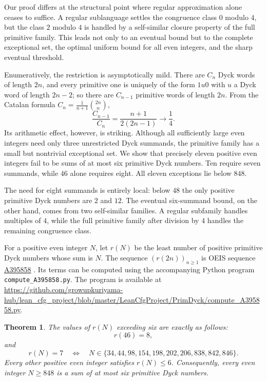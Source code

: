 \documentclass[12pt]{article}
\theoremstyle{plain}
\newtheorem{theorem}{Theorem}
\newcommand{\seqnum}[1]{\href{https://oeis.org/#1}{\rm \underline{#1}}}
\begin{document}
Our proof differs at the structural point where regular approximation
alone ceases to suffice.  A regular sublanguage settles the congruence
class $0$ modulo $4$, but the class $2$ modulo $4$ is handled by a
self-similar closure property of the full primitive family.  This leads
not only to an eventual bound but to the complete exceptional set, the
optimal uniform bound for all even integers, and the sharp eventual
threshold.

Enumeratively, the restriction is asymptotically mild.  There are $C_n$
Dyck words of length $2n$, and every primitive one is uniquely of the
form $1u0$ with $u$ a Dyck word of length $2n-2$; so there are
$C_{n-1}$ primitive words of length $2n$.  From the Catalan formula
$C_n=\frac1{n+1}\binom{2n}{n}$,
\[
 \frac{C_{n-1}}{C_n}=\frac{n+1}{2(2n-1)}\longrightarrow\frac14 .
\]
Its arithmetic effect, however, is striking.  Although all sufficiently
large even integers need only three unrestricted Dyck summands, the
primitive family has a small but nontrivial exceptional set.  We show
that precisely eleven positive even integers fail to be sums of at most
six primitive Dyck numbers.  Ten require seven summands, while $46$
alone requires eight.  All eleven exceptions lie below $848$.

The need for eight summands is entirely local: below $48$ the only
positive primitive Dyck numbers are $2$ and $12$.  The eventual
six-summand bound, on the other hand, comes from two self-similar
families.  A regular subfamily handles multiples of $4$, while the full
primitive family after division by $4$ handles the remaining congruence
class.

For a positive even integer $N$, let $r(N)$ be the least number of
positive primitive Dyck numbers whose sum is $N$.  The sequence
$(r(2n))_{n\geq1}$ is OEIS sequence \seqnum{A395858} \cite{OEIS}.
Its terms can be computed using the accompanying Python program
\texttt{compute\_A395858.py}.  The program is available at
\url{https://github.com/growupkuriyama-hub/lean_cfg_project/blob/master/LeanCfgProject/PrimDyck/compute_A395858.py}.

\begin{theorem}\label{thm:main}
The values of $r(N)$ exceeding six are exactly as follows:
\[
 r(46)=8,
\]
and
\[
 r(N)=7
 \quad\Longleftrightarrow\quad
 N\in\{34,44,98,154,198,202,206,838,842,846\}.
\]
Every other positive even integer satisfies $r(N)\leq6$.  Consequently,
every even integer $N\geq848$ is a sum of at most six primitive Dyck
numbers.
\end{theorem}
\end{document}
